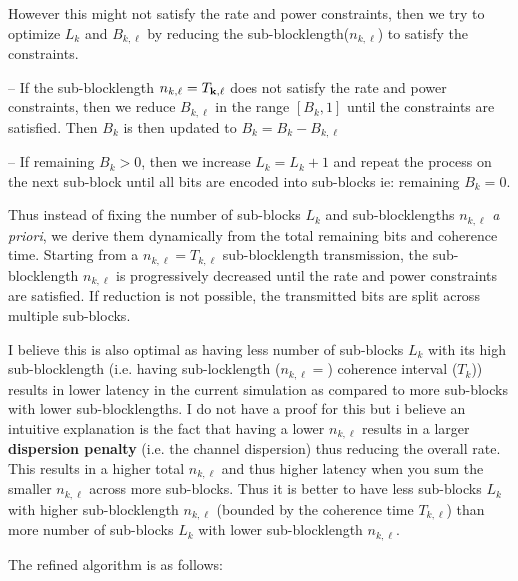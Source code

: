 \documentclass[a4paper, 12pt, onecolumn, journal, twoside, draftclsnofoot]{IEEEtran}
\begin{document}
However this might not satisfy the rate and power constraints, then we try to optimize $L_k$ and $B_{k,\ell}$ by reducing the sub-blocklength($n_{k,\ell}$) to satisfy the constraints.

--\> If the sub-blocklength $n_{k,\ell} = T_{{\bf k},\ell}$ does not satisfy the rate and power constraints, then we reduce $B_{k,\ell}$ in the range $[B_k, 1]$ until the constraints are satisfied.
    Then $B_{k}$ is then updated to $B_{k} = B_{k} - B_{k,\ell}$

--\> If remaining $B_{k} >0 $, then we increase $L_k = L_k+1$ and repeat the process on the next sub-block until all bits are encoded into sub-blocks ie: remaining $B_k = 0$.



Thus instead of fixing the number of sub-blocks $L_k$ and sub-blocklengths $n_{k,\ell}$ \emph{a priori}, we derive them dynamically from the total remaining bits and coherence time. Starting from a $n_{k,\ell} = T_{k,\ell}$ sub-blocklength transmission, the sub-blocklength $n_{k,\ell}$ is progressively decreased until the rate and power constraints are satisfied. If reduction is not possible, the transmitted bits are split across multiple sub-blocks.

I believe this is also optimal as having less number of sub-blocks $L_k$ with its high sub-blocklength (i.e. having sub-locklength ($n_{k,\ell} = $)  coherence interval ($T_k$)) results in lower latency in the current simulation as compared to more sub-blocks with lower sub-blocklengths.  I do not have a proof for this but i believe an intuitive explanation is the fact that having a lower $n_{k,\ell}$ results in a larger \textbf{dispersion penalty} (i.e. the channel dispersion) thus reducing the overall rate. This results in a higher total $n_{k,\ell}$ and thus higher latency when you sum the smaller $n_{k,\ell}$ across more sub-blocks. 
Thus it is better to have less sub-blocks $L_k$ with higher sub-blocklength $n_{k,\ell}$ (bounded by the coherence time $T_{k,\ell}$) than more number of sub-blocks $L_k$ with lower sub-blocklength $n_{k,\ell}$.

The refined algorithm is as follows:
\end{document}
